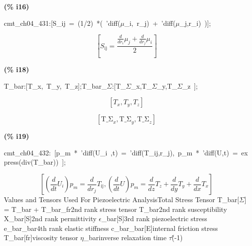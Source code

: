 \documentclass[fleqn]{article}
\begin{document}
\noindent
\begin{minipage}[t]{4.000000em}\color{red}\bfseries
(\% i16)	
\end{minipage}
\begin{minipage}[t]{\textwidth}\color{blue}
cmt\_ch04\_431:[S\_ij\ =\ (1/2)\ *(\ 'diff(\ensuremath{\mu}\_i,\ r\_j)\ +\ 'diff(\ensuremath{\mu}\_j,r\_i)\ )];
\end{minipage}
\[\displaystyle \tag{\% o16} 
\left[ {S_{\ensuremath{\mathrm{ij}}}}=\frac{\frac{d}{d {r_i}} {{\mu }_j}+\frac{d}{d {r_j}} {{\mu }_i}}{2}\right] \mbox{}
\]


\noindent
\begin{minipage}[t]{4.000000em}\color{red}\bfseries
(\% i18)	
\end{minipage}
\begin{minipage}[t]{\textwidth}\color{blue}
T\_bar:[T\_x,\ T\_y,\ T\_z];T\_bar\_\ensuremath{\Sigma}:[T\_\ensuremath{\Sigma}\_x,T\_\ensuremath{\Sigma}\_y,T\_\ensuremath{\Sigma}\_z\ ];
\end{minipage}
\[\displaystyle \tag{\% o17} 
\left[ {T_x}\operatorname{,}{T_y}\operatorname{,}{T_z}\right] \mbox{}\]

\[\tag{\% o18} 
\left[ {{\ensuremath{\mathrm{T\_ \Sigma }}}_x}\operatorname{,}{{\ensuremath{\mathrm{T\_ \Sigma }}}_y}\operatorname{,}{{\ensuremath{\mathrm{T\_ \Sigma }}}_z}\right] \mbox{}
\]


\noindent
\begin{minipage}[t]{4.000000em}\color{red}\bfseries
(\% i19)	
\end{minipage}
\begin{minipage}[t]{\textwidth}\color{blue}
cmt\_ch04\_432:\ [p\_m\ *\ 'diff(U\_i\ ,t)\ =\ 'diff(T\_ij,r\_j),\ p\_m\ *\ 'diff(U,t)\ =\ express(div(T\_bar))\ ];
\end{minipage}
\[\displaystyle \tag{\% o19} 
\left[ \left( \frac{d}{d t} {U_i}\right)  {p_m}=\frac{d}{d {r_j}} {T_{\ensuremath{\mathrm{ij}}}}\operatorname{,}\left( \frac{d}{d t} U\right)  {p_m}=\frac{d}{d z} {T_z}+\frac{d}{d y} {T_y}+\frac{d}{d x} {T_x}\right] \mbox{}
\]
Values and Tensors Used For Piezoelectric AnalysisTotal Stress Tensor                      T\_bar[\ensuremath{\Sigma}] = T\_bar + T\_bar\_fr2nd rank stress tensor                 T\_bar2nd rank susceptibility                X\_bar[S]2nd rank  permittivity                  \ensuremath{\epsilon}\_bar[S]3rd rank piezoelectric stress        e\_bar\_bar4th rank elastic stiffness             c\_bar\_bar[E]internal friction stress                 T\_bar[fr]viscosity tensor                            \ensuremath{\eta}\_barinverse relaxation time                 \ensuremath{\tau}\^ (-1)
\end{document}
